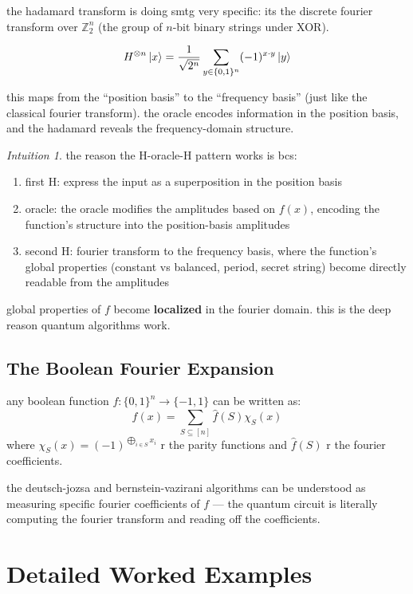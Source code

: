 \documentclass[11pt,a4paper]{article}
\theoremstyle{definition}
\theoremstyle{remark}
\newtheorem*{intuition}{Intuition}
\begin{document}
the hadamard transform is doing smtg very specific: its the discrete fourier transform over $\mathbb{Z}_2^n$ (the group of $n$-bit binary strings under XOR).

\[
H^{\otimes n}\ket{x} = \frac{1}{\sqrt{2^n}}\sum_{y \in \{0,1\}^n} (-1)^{x \cdot y}\ket{y}
\]

this maps from the ``position basis'' to the ``frequency basis'' (just like the classical fourier transform). the oracle encodes information in the position basis, and the hadamard reveals the frequency-domain structure.

\begin{intuition}
the reason the H-oracle-H pattern works is bcs:
\begin{enumerate}
    \item first H: express the input as a superposition in the position basis
    \item oracle: the oracle modifies the amplitudes based on $f(x)$, encoding the function's structure into the position-basis amplitudes
    \item second H: fourier transform to the frequency basis, where the function's global properties (constant vs balanced, period, secret string) become directly readable from the amplitudes
\end{enumerate}
global properties of $f$ become \textbf{localized} in the fourier domain. this is the deep reason quantum algorithms work.
\end{intuition}

\subsection{The Boolean Fourier Expansion}

any boolean function $f: \{0,1\}^n \to \{-1, 1\}$ can be written as:
\[
f(x) = \sum_{S \subseteq [n]} \hat{f}(S) \chi_S(x)
\]
where $\chi_S(x) = (-1)^{\bigoplus_{i \in S} x_i}$ r the parity functions and $\hat{f}(S)$ r the fourier coefficients.

the deutsch-jozsa and bernstein-vazirani algorithms can be understood as measuring specific fourier coefficients of $f$ --- the quantum circuit is literally computing the fourier transform and reading off the coefficients.

\section{Detailed Worked Examples}
\end{document}
